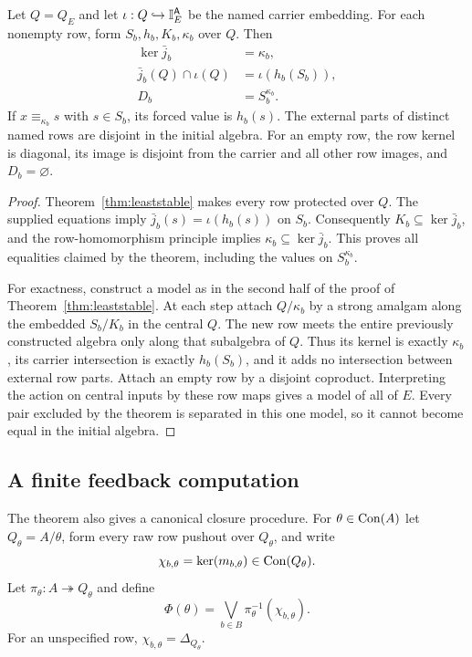 \begin{theorem}\label{thm:globalrows}
Let $Q=Q_E$ and let $\iota:Q\hookrightarrow\mathbb I_E^{\mathsf{A}}$ be the named
carrier embedding. For each nonempty row, form $S_b,h_b,K_b,\kappa_b$ over
$Q$. Then
\begin{align}
\ker\bar j_b&=\kappa_b,\label{eq:globalrowkernel}\\
\bar j_b(Q)\cap\iota(Q)&=\iota(h_b(S_b)),\label{eq:globalrowintersection}\\
D_b&=S_b^{\kappa_b}.\label{eq:globaldomain}
\end{align}
If $x\equiv_{\kappa_b}s$ with $s\in S_b$, its forced value is $h_b(s)$.
The external parts of distinct named rows are disjoint in the initial
algebra. For an empty row, the row kernel is diagonal, its image is disjoint
from the carrier and all other row images, and $D_b=\varnothing$.
\end{theorem}

\begin{proof}
Theorem~\ref{thm:leaststable} makes every row protected over $Q$.
The supplied equations imply $\bar j_b(s)=\iota(h_b(s))$ on $S_b$.
Consequently $K_b\subseteq\ker\bar j_b$, and the row-homomorphism principle
implies $\kappa_b\subseteq\ker\bar j_b$. This proves all equalities claimed
by the theorem, including the values on $S_b^{\kappa_b}$.

For exactness, construct a model as in the second half of the proof of
Theorem~\ref{thm:leaststable}. At each step attach $Q/\kappa_b$ by a strong
amalgam along the embedded $S_b/K_b$ in the central $Q$. The new row meets
the entire previously constructed algebra only along that subalgebra of
$Q$. Thus its kernel is exactly $\kappa_b$, its carrier intersection is
exactly $h_b(S_b)$, and it adds no intersection between external row parts.
Attach an empty row by a disjoint coproduct. Interpreting the action on
central inputs by these row maps gives a model of all of $E$.
Every pair excluded by the theorem is separated in this one model, so it
cannot become equal in the initial algebra.
\end{proof}

\subsection{A finite feedback computation}

The theorem also gives a canonical closure procedure.  For $\theta\in\operatorname{Con}(A)$ let $Q_\theta=A/\theta$, form every raw row pushout over $Q_\theta$, and write
\[
\chi_{b,\theta}=\ker(m_{b,\theta})\in\operatorname{Con}(Q_\theta).
\]
Let $\pi_\theta:A\twoheadrightarrow Q_\theta$ and define
\begin{equation}\label{eq:Phi}
\Phi(\theta)
=
\bigvee_{b\in B}\pi_\theta^{-1}(\chi_{b,\theta}).
\end{equation}
For an unspecified row, $\chi_{b,\theta}=\Delta_{Q_\theta}$.

